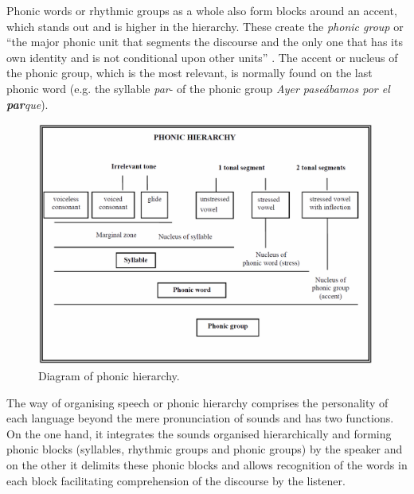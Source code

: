 \documentclass[output=paper]{langscibook}
\begin{document}
{Phonic words or rhythmic groups as a whole also form blocks around an accent, which stands out and is higher in the hierarchy. These create the \textit{phonic group} or ``the major phonic unit that segments the discourse and the only one that has its own identity and is not conditional upon other units'' \citep[83]{CanteroSerena.op.2002}. The accent or nucleus of the phonic group, which is the most relevant, is normally found on the last phonic word (e.g. the syllable \textit{par}- of the phonic group \textit{Ayer paseábamos por el} \textbf{\textit{par}}\textit{que}).} 

\newcommand{\fb}[2][1.7cm]{\framebox{\parbox{#1}{#2}}}
\newcommand{\ub}[2]{\underbrace{#1}_{\text{#2}}}
\begin{figure} 

\includegraphics[width=0.99\textwidth]{figures/FON-img1.PNG}

 

\caption{\label{fig:font:1} Diagram of phonic hierarchy.}
\end{figure}

{The way of organising speech or phonic hierarchy comprises the personality of each language beyond the mere pronunciation of sounds and has two functions. On the one hand, it integrates the sounds organised hierarchically and forming phonic blocks (syllables, rhythmic groups and phonic groups) by the speaker and on the other it delimits these phonic blocks and allows recognition of the words in each block facilitating comprehension of the discourse by the listener.} 
\end{document}
